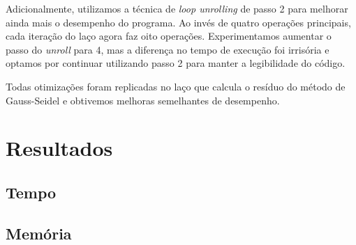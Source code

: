 \documentclass[12pt]{article}
\begin{document}
	Adicionalmente, utilizamos a técnica de \emph{loop unrolling} de passo 2 para melhorar ainda mais o desempenho do programa.
	Ao invés de quatro operações principais, cada iteração do laço agora faz oito operações.
	Experimentamos aumentar o passo do \emph{unroll} para 4, mas a diferença no tempo de execução foi irrisória e optamos por continuar utilizando passo 2 para manter a legibilidade do código.
	
	Todas otimizações foram replicadas no laço que calcula o resíduo do método de Gauss-Seidel e obtivemos melhoras semelhantes de desempenho.

\newpage

\section{Resultados}

\subsection{Tempo}

\subsection{Memória}

\newpage
\end{document}
